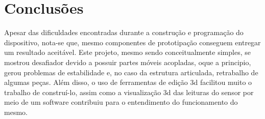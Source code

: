 
\chapter{Conclusões}\label{cap:conclusoeseperspectivas}

Apesar das dificuldades encontradas durante a construção e programação do dispositivo, nota-se que, mesmo componentes de prototipação conseguem entregar um resultado aceitável. Este projeto, mesmo sendo conceitualmente simples, se mostrou desafiador devido a possuir partes móveis acopladas, oque a principio, gerou problemas de estabilidade e, no caso da estrutura articulada, retrabalho de algumas peças. Além disso, o uso de ferramentas de edição 3d facilitou muito o trabalho de construí-lo, assim como a visualização 3d das leituras do sensor por meio de um software contribuiu para o entendimento do funcionamento do mesmo.
